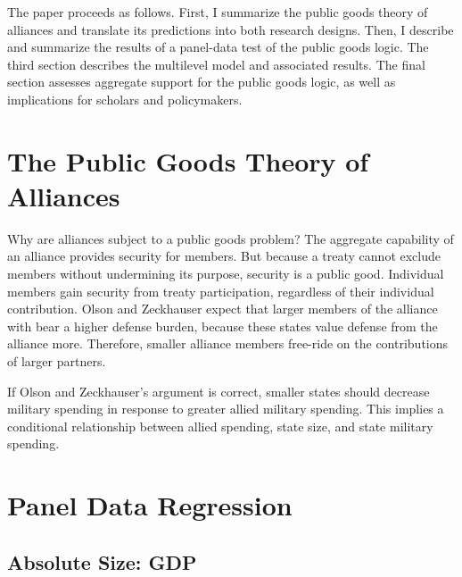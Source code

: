 \documentclass[12pt]{article}
\begin{document}
The paper proceeds as follows.
First, I summarize the public goods theory of alliances and translate its predictions into both research designs.
Then, I describe and summarize the results of a panel-data test of the public goods logic.
The third section describes the multilevel model and associated results. 
The final section assesses aggregate support for the public goods logic, as well as implications for scholars and policymakers. 


\section{The Public Goods Theory of Alliances}


Why are alliances subject to a public goods problem? 
The aggregate capability of an alliance provides security for members. 
But because a treaty cannot exclude members without undermining its purpose, security is a public good. 
Individual members gain security from treaty participation, regardless of their individual contribution. 
Olson and Zeckhauser expect that larger members of the alliance with bear a higher defense burden, because these states value defense from the alliance more. 
Therefore, smaller alliance members free-ride on the contributions of larger partners. 




If Olson and Zeckhauser's argument is correct, smaller states should decrease military spending in response to greater allied military spending. 
This implies a conditional relationship between allied spending, state size, and state military spending. 

\section{Panel Data Regression}



\subsection{Absolute Size: GDP}
\end{document}
